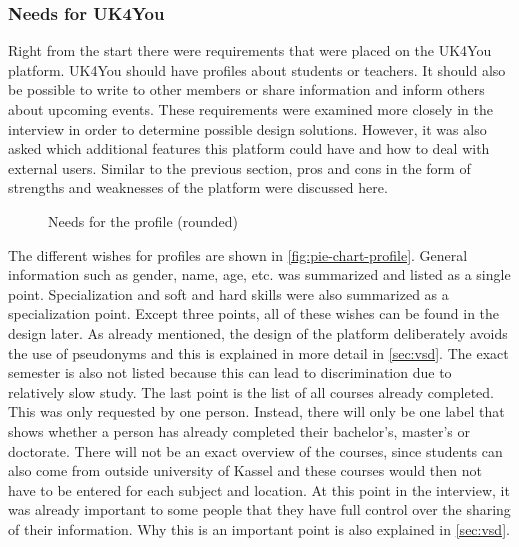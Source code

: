 \subsubsection{Needs for UK4You}
Right from the start there were requirements that were placed on the UK4You platform.\linebreak
UK4You should have profiles about students or teachers.
It should also be possible to write to other members or share information and inform others about upcoming events.
These requirements were examined more closely in the interview in order to determine possible design solutions.
However, it was also asked which additional features this platform could have and how to deal with external users.
Similar to the previous section, pros and cons in the form of strengths and weaknesses of the platform were discussed here.\\

\begin{figure}[ht]
    \centering
    \caption{Needs for the profile (rounded)}
    \label{fig:pie-chart-profile}
\end{figure}

The different wishes for profiles are shown in \autoref{fig:pie-chart-profile}.
General information such as gender, name, age, etc. was summarized and listed as a single point.
Specialization and soft and hard skills were also summarized as a specialization point.
Except three points, all of these wishes can be found in the design later.
As already mentioned, the design of the platform deliberately avoids the use of pseudonyms and this is explained in more detail in \autoref{sec:vsd}.
The exact semester is also not listed because this can lead to discrimination due to relatively slow study.
The last point is the list of all courses already completed.
This was only requested by one person.
Instead, there will only be one label that shows whether a person has already completed their bachelor's, master's or doctorate.
There will not be an exact overview of the courses, since students can also come from outside university of Kassel and these courses would then not have to be entered for each subject and location.
At this point in the interview, it was already important to some people that they have full control over the sharing of their information.
Why this is an important point is also explained in \autoref{sec:vsd}.\\

